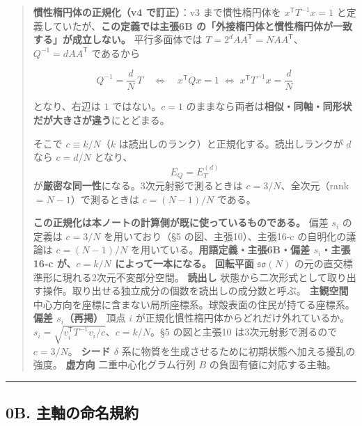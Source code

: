 \documentclass[
  10pt,
]{ltjsarticle}
\begin{document}
\begin{quote}
\textbf{慣性楕円体の正規化（v4 で訂正）}：v3 まで慣性楕円体を
\(x^{\mathsf T}T^{-1}x = 1\)
と定義していたが、\textbf{この定義では主張6B
の「外接楕円体と慣性楕円体が一致する」が成立しない。} 平行多面体では
\(T = 2^dAA^{\mathsf T} = NAA^{\mathsf T}\)、\(Q^{-1} = dAA^{\mathsf T}\)
であるから

\[Q^{-1} = \frac{d}{N}\,T \quad\Longleftrightarrow\quad x^{\mathsf T}Qx = 1 \;\iff\; x^{\mathsf T}T^{-1}x = \frac{d}{N}\]

となり、右辺は \(1\) ではない。\(c = 1\)
のままなら両者は\textbf{相似・同軸・同形状だが大きさが違う}にとどまる。

そこで \(c \equiv k/N\)（\(k\)
は読出しのランク）と正規化する。読出しランクが \(d\) なら \(c = d/N\)
となり、\[\boxed{\;E_Q = E_T^{(d)}\;}\]
が\textbf{厳密な同一性}になる。3次元射影で測るときは
\(c = 3/N\)、全次元（rank \(= N-1\)）で測るときは \(c = (N-1)/N\)
である。

\textbf{この正規化は本ノートの計算側が既に使っているものである。} 偏差
\(s_i\) の定義は \(c = 3/N\) を用いており（§5 の図、主張10）、主張16-c
の自明化の議論は \(c = (N-1)/N\)
を用いている。\textbf{用語定義・主張6B・偏差 \(s_i\)・主張16-c
が、\(c = k/N\) によって一本になる。} \textbar{} \textbf{回転平面}
\textbar{} \(\mathfrak{so}(N)\)
の元の直交標準形に現れる2次元不変部分空間。 \textbar{} \textbar{}
\textbf{読出し} \textbar{}
状態から二次形式として取り出す操作。取り出せる独立成分の個数を読出しの成分数と呼ぶ。
\textbar{} \textbar{} \textbf{主観空間} \textbar{}
中心方向を座標に含まない局所座標系。球殻表面の住民が持てる座標系。
\textbar{} \textbar{} \textbf{偏差 \(s_i\)（再掲）} \textbar{} 頂点
\(i\)
が正規化慣性楕円体からどれだけ外れているか。\(s_i = \sqrt{v_i^{\mathsf T}T^{-1}v_i / c}\)、\(c = k/N\)。§5
の図と主張10 は3次元射影で測るので \(c = 3/N\)。 \textbar{} \textbar{}
\textbf{シード \(\delta\)} \textbar{}
系に物質を生成させるために初期状態へ加える擾乱の強度。 \textbar{}
\textbar{} \textbf{虚方向} \textbar{} 二重中心化グラム行列 \(B\)
の負固有値に対応する主軸。 \textbar{}
\end{quote}

\begin{center}\rule{0.5\linewidth}{0.5pt}\end{center}

\subsection{0B.
主軸の命名規約}\label{b.-ux4e3bux8ef8ux306eux547dux540dux898fux7d04}
\end{document}
